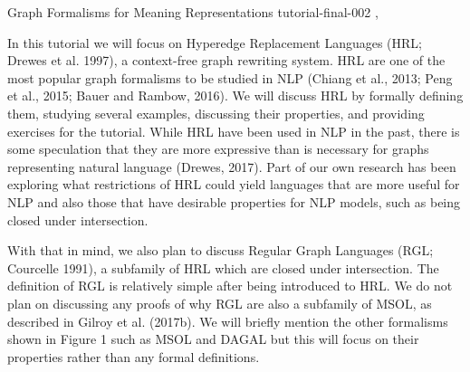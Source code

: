 \begin{tutorial}
  {Graph Formalisms for Meaning Representations}
  {tutorial-final-002}
  {\daydateyear, \tutorialmorningtime}
  {\TutLocB}

In this tutorial we will focus on Hyperedge Replacement Languages (HRL; Drewes et al. 1997), a context-free graph rewriting system. HRL are one of the most popular graph formalisms to be studied in NLP (Chiang et al., 2013; Peng et al., 2015; Bauer and Rambow, 2016). We will discuss HRL by formally defining them, studying several examples, discussing their properties, and providing exercises for the tutorial. While HRL have been used in NLP in the past, there is some speculation that they are more expressive than is necessary for graphs representing natural language (Drewes, 2017). Part of our own research has been exploring what restrictions of HRL could yield languages that are more useful for NLP and also those that have desirable properties for NLP models, such as being closed under intersection.

With that in mind, we also plan to discuss Regular Graph Languages (RGL; Courcelle 1991), a subfamily of HRL which are closed under intersection. The definition of RGL is relatively simple after being introduced to HRL. We do not plan on discussing any proofs of why RGL are also a subfamily of MSOL, as described in Gilroy et al. (2017b). We will briefly mention the other formalisms shown in Figure 1 such as MSOL and DAGAL but this will focus on their properties rather than any formal definitions.

\end{tutorial}
